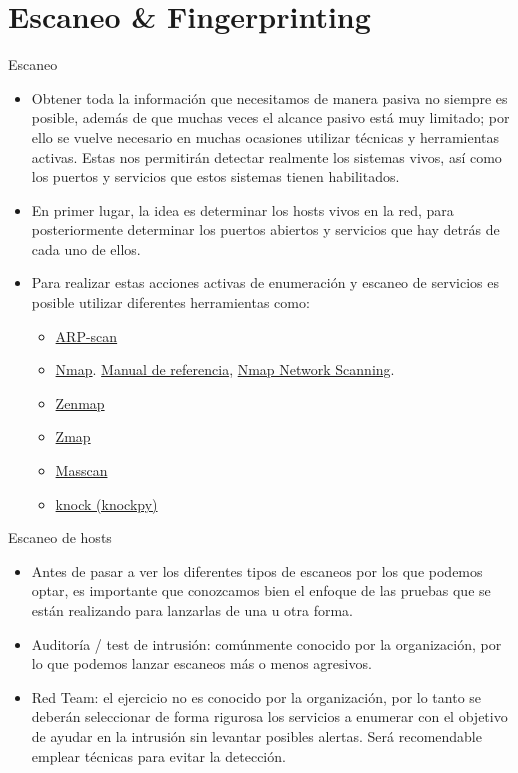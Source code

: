\documentclass[aspectratio=169,11pt]{beamer}
\begin{document}
\section{Escaneo \& Fingerprinting}

\begin{frame}[allowframebreaks]{Escaneo}
\small
  \begin{itemize}
  \item Obtener toda la información que necesitamos de manera pasiva no siempre es posible, además de que muchas veces el alcance pasivo está muy limitado; por ello se vuelve necesario en muchas ocasiones utilizar técnicas y herramientas activas. Estas nos permitirán detectar realmente los sistemas vivos, así como los puertos y servicios que estos sistemas tienen habilitados.
  \item En primer lugar, la idea es determinar los hosts vivos en la red, para posteriormente determinar los puertos abiertos y servicios que hay detrás de cada uno de ellos.
  \item Para realizar estas acciones activas de enumeración y escaneo de servicios es posible utilizar diferentes herramientas como:
    \begin{itemize}
    \item \href{https://github.com/royhills/arp-scan}{ARP-scan}
    \item \href{https://nmap.org}{Nmap}.
      \href{https://nmap.org/book/man.html}{Manual de referencia},
      \href{https://nmap.org/book/}{Nmap Network Scanning}.
    \item \href{https://nmap.org/zenmap/}{Zenmap}
    \item \href{https://zmap.io}{Zmap}
    \item \href{https://github.com/robertdavidgraham/masscan}{Masscan}
    \item \href{https://github.com/guelfoweb/knock}{knock (knockpy)}
    \end{itemize}
  \end{itemize}
\end{frame}

\begin{frame}[allowframebreaks]{Escaneo de hosts}
\small
  \begin{itemize}
  \item Antes de pasar a ver los diferentes tipos de escaneos por los que podemos optar, es importante que conozcamos bien el enfoque de las pruebas que se están realizando para lanzarlas de una u otra forma.
  \item Auditoría / test de intrusión: comúnmente conocido por la organización, por lo que podemos lanzar escaneos más o menos agresivos.
  \item Red Team: el ejercicio no es conocido por la organización, por lo tanto se deberán seleccionar de forma rigurosa los servicios a enumerar con el objetivo de ayudar en la intrusión sin levantar posibles alertas. Será recomendable emplear técnicas para evitar la detección.
  \end{itemize}
\end{frame}
\end{document}
